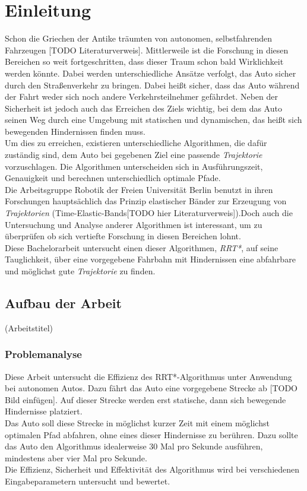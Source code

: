 \section{Einleitung}
Schon die Griechen der Antike träumten von autonomen, selbstfahrenden Fahrzeugen [TODO Literaturverweis]. Mittlerweile ist die Forschung in diesen Bereichen so weit fortgeschritten, dass dieser Traum schon bald Wirklichkeit werden könnte. Dabei werden unterschiedliche Ansätze verfolgt, das Auto sicher durch den Straßenverkehr zu bringen. Dabei heißt sicher, dass das Auto während der Fahrt weder sich noch andere Verkehrsteilnehmer gefährdet. Neben der Sicherheit ist jedoch auch das Erreichen des Ziels wichtig, bei dem das Auto seinen Weg durch eine Umgebung mit statischen und dynamischen, das heißt sich bewegenden Hindernissen finden muss. \\
Um dies zu erreichen, existieren unterschiedliche Algorithmen, die dafür zuständig sind, dem Auto bei gegebenen Ziel eine passende \textit{Trajektorie} vorzuschlagen. Die Algorithmen unterscheiden sich in Ausführungszeit, Genauigkeit und berechnen unterschiedlich optimale Pfade.  \\
Die Arbeitsgruppe Robotik der Freien Universität Berlin benutzt in ihren Forschungen hauptsächlich das Prinzip elastischer Bänder zur Erzeugung von \textit{Trajektorien} (Time-Elastic-Bands[TODO hier Literaturverweis]).Doch auch die Untersuchung und Analyse anderer Algorithmen ist interessant, um zu überprüfen ob sich vertiefte Forschung in diesen Bereichen lohnt. \\
Diese Bachelorarbeit untersucht einen dieser Algorithmen, \textit{RRT*}, auf seine Tauglichkeit, über eine vorgegebene Fahrbahn mit Hindernissen eine abfahrbare und möglichst gute \textit{Trajektorie} zu finden.



\subsection{Aufbau der Arbeit}
(Arbeitstitel) \\
\subsubsection{Problemanalyse}
Diese Arbeit untersucht die Effizienz des RRT*-Algorithmus unter Anwendung bei autonomen Autos. Dazu fährt das Auto eine vorgegebene Strecke ab [TODO Bild einfügen]. Auf dieser Strecke werden erst statische, dann sich bewegende Hindernisse platziert. \\
Das Auto soll diese Strecke in möglichst kurzer Zeit mit einem möglichst optimalen Pfad abfahren, ohne eines dieser Hindernisse zu berühren. Dazu sollte das Auto den Algorithmus idealerweise 30 Mal pro Sekunde ausführen, mindestens aber vier Mal pro Sekunde. \\
Die Effizienz, Sicherheit und Effektivität des Algorithmus wird bei verschiedenen Eingabeparametern untersucht und bewertet. \\

